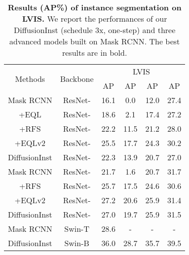 \documentclass{article}
\begin{document}
\begin{table}[t]
\centering
 \begin{tabular}{c|c|c|ccc}
\toprule 
  \multirow{2}{*}{Methods}
  & \multirow{2}{*}{Backbone}
  & \multicolumn{4}{c}{LVIS} \\
& 
  & AP 
  & AP 
  & AP 
  & AP  \\
\midrule
  Mask RCNN &  ResNet-  &16.1  &0.0 & 12.0  & 27.4 \\
  +EQL &  ResNet-  &18.6   & 2.1& 17.4 &27.2      \\
  +RFS &  ResNet-  &22.2 &11.5& 21.2& 28.0 \\
  +EQLv2 &  ResNet-  &25.5 &17.7& 24.3 &30.2 \\
  DiffusionInst &  ResNet-  & 22.3 &13.9&20.7&27.0  \\ \midrule
  Mask RCNN &  ResNet-  & 21.7& 1.6& 20.7& 31.7 \\
  +RFS &  ResNet-  &25.7& 17.5& 24.6& 30.6   \\
  +EQLv2 &  ResNet-  &27.2 &20.6& {25.9}& 31.4  \\
  DiffusionInst &  ResNet-  & 27.0 & 19.7 & 25.9 &31.5    \\ \midrule
  Mask RCNN & Swin-T& 28.6&-&-&- \\
  DiffusionInst &  Swin-B  &{36.0}  & {28.7} & {35.7} & {39.5}  \\ \bottomrule
\end{tabular}
\caption{\textbf{Results (AP\%) of instance segmentation on LVIS.} We report the performances of our DiffusionInst (schedule 3x, one-step) and three advanced models built on Mask RCNN. The best results are in bold.}
\label{sota_lvis}
\end{table}
\end{document}
